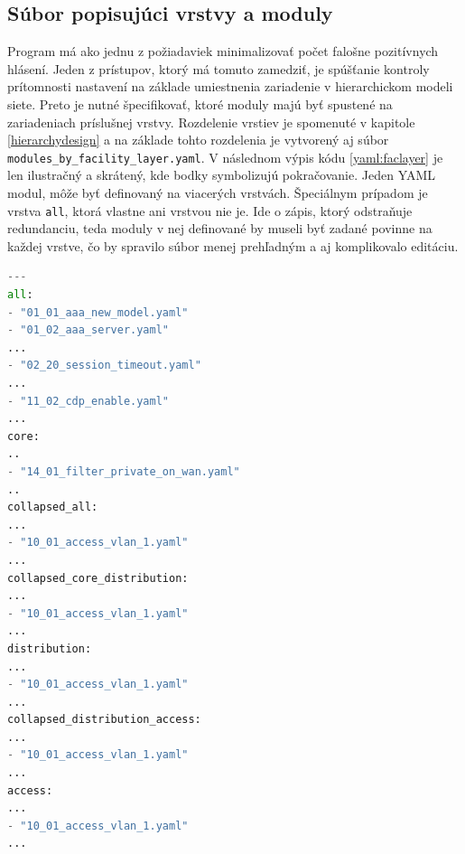 \subsection{Súbor popisujúci vrstvy a moduly}
Program má ako jednu z požiadaviek minimalizovať počet falošne pozitívnych hlásení. Jeden z prístupov, ktorý má tomuto zamedziť, je spúšťanie kontroly prítomnosti nastavení  na základe umiestnenia zariadenie v hierarchickom modeli siete. Preto je nutné špecifikovať, ktoré moduly majú byť spustené na zariadeniach príslušnej vrstvy. Rozdelenie vrstiev je spomenuté v kapitole \ref{hierarchydesign} a na základe tohto rozdelenia je vytvorený aj súbor \texttt{modules\_by\_facility\_layer.yaml}. V následnom výpis kódu \ref{yaml:faclayer} je len ilustračný a skrátený, kde bodky symbolizujú pokračovanie. Jeden YAML modul, môže byť definovaný na viacerých vrstvách. Špeciálnym prípadom je vrstva \texttt{all}, ktorá vlastne ani vrstvou nie je. Ide o zápis, ktorý odstraňuje redundanciu, teda moduly v nej definované by museli byť zadané povinne na každej vrstve, čo by spravilo súbor menej prehľadným a aj komplikovalo editáciu.

\begin{lstlisting}[frame=single,numbers=right,caption={Skrátený konfiguračný súbor \texttt{modules\_by\_facility\_layer.yaml}, ktorý popisuje, aké moduly môžu byť spúšťané na jednotlivých vrstvách},label=yaml:faclayer,basicstyle=\ttfamily\small, keywordstyle=\color{black},language=python,breaklines=true]
---
all:
- "01_01_aaa_new_model.yaml"
- "01_02_aaa_server.yaml"
...
- "02_20_session_timeout.yaml"
...
- "11_02_cdp_enable.yaml"
...
core: 
..
- "14_01_filter_private_on_wan.yaml"
..
collapsed_all:
...
- "10_01_access_vlan_1.yaml"
...
collapsed_core_distribution:
...
- "10_01_access_vlan_1.yaml"
...
distribution: 
...
- "10_01_access_vlan_1.yaml"
...
collapsed_distribution_access:
...
- "10_01_access_vlan_1.yaml"
...
access: 
...
- "10_01_access_vlan_1.yaml"
...

\end{lstlisting}

